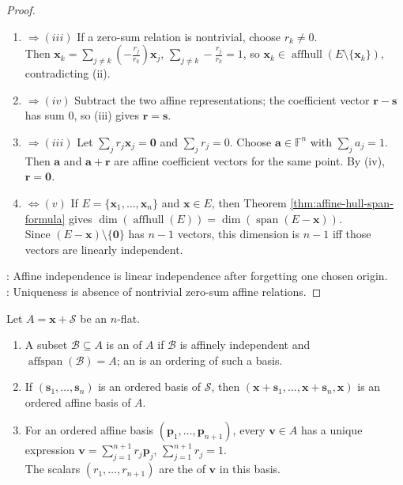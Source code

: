 \begin{theorem}
\begin{proof}
\begin{enumerate}[label=(\roman*).]
giving a nontrivial zero-sum relation, contradiction.
\item[$(ii)$]$\Rightarrow (iii)$ If a zero-sum relation is nontrivial, choose $r_k\neq0$.\\
Then $\mathbf{x}_k=\sum\limits_{j\neq k}\left(-\frac{r_j}{r_k}\right)\mathbf{x}_j$, $\sum\limits_{j\neq k}-\frac{r_j}{r_k}=1$, so $\mathbf{x}_k\in\operatorname{affhull}(E\setminus\{\mathbf{x}_k\})$, contradicting (ii).
\item[$(iii)$]$\Rightarrow (iv)$ Subtract the two affine representations; the coefficient vector $\mathbf{r}-\mathbf{s}$ has sum $0$, so (iii) gives $\mathbf{r}=\mathbf{s}$.
\item[$(iv)$]$\Rightarrow (iii)$ Let $\sum_j r_j\mathbf{x}_j=\mathbf{0}$ and $\sum_j r_j=0$. Choose $\mathbf{a}\in\mathbb{F}^n$ with $\sum_j a_j=1$.\\
Then $\mathbf{a}$ and $\mathbf{a}+\mathbf{r}$ are affine coefficient vectors for the same point. By (iv), $\mathbf{r}=\mathbf{0}$.
\item[$(i)$]$\Leftrightarrow (v)$ If $E=\{\mathbf{x}_1,\ldots,\mathbf{x}_n\}$ and $\mathbf{x}\in E$, then Theorem \ref{thm:affine-hull-span-formula} gives $\dim(\operatorname{affhull}(E))=\dim(\operatorname{span}(E-\mathbf{x}))$.\\
Since $(E-\mathbf{x})\setminus\{\mathbf{0}\}$ has $n-1$ vectors, this dimension is $n-1$ iff those vectors are linearly independent.
\end{enumerate}
: Affine independence is linear independence after forgetting one chosen origin.\\
: Uniqueness is absence of nontrivial zero-sum affine relations.
\end{proof}
\end{theorem}

\begin{definition} \label{def:affine-basis-barycentric-coordinates} 
Let $A=\mathbf{x}+\mathcal{S}$ be an $n$-flat.
\begin{enumerate}[label=(\roman*)]
\setlength{\itemsep}{0pt}
\item A subset $\mathcal{B}\subseteq A$ is an  of $A$ if $\mathcal{B}$ is affinely independent and $\operatorname{affspan}(\mathcal{B})=A$; an  is an ordering of such a basis.
\item If $(\mathbf{s}_1,\ldots,\mathbf{s}_n)$ is an ordered basis of $\mathcal{S}$, then $(\mathbf{x}+\mathbf{s}_1,\ldots,\mathbf{x}+\mathbf{s}_n,\mathbf{x})$ is an ordered affine basis of $A$.
\item For an ordered affine basis $(\mathbf{p}_1,\ldots,\mathbf{p}_{n+1})$, every $\mathbf{v}\in A$ has a unique expression $\mathbf{v}=\sum\limits_{j=1}^{n+1}r_j\mathbf{p}_j$, $\sum\limits_{j=1}^{n+1}r_j=1$.\\
The scalars $(r_1,\ldots,r_{n+1})$ are the  of $\mathbf{v}$ in this basis.
\end{enumerate}
\end{definition}

